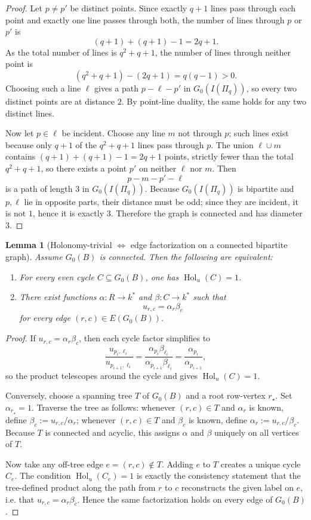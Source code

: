 \documentclass[11pt]{amsart}
\numberwithin{equation}{section}
\theoremstyle{plain}
\newtheorem{lemma}[theorem]{Lemma}
\theoremstyle{definition}
\theoremstyle{remark}
\begin{document}
\begin{proof}
Let $p\neq p'$ be distinct points. Since exactly $q+1$ lines pass through each point and exactly one line passes through both,
the number of lines through $p$ or $p'$ is
\[
(q+1)+(q+1)-1=2q+1.
\]
As the total number of lines is $q^2+q+1$, the number of lines through neither point is
\[
(q^2+q+1)-(2q+1)=q(q-1)>0.
\]
Choosing such a line $\ell$ gives a path $p-\ell-p'$ in $G_0(I(\Pi_q))$, so every two distinct points are at distance $2$.
By point-line duality, the same holds for any two distinct lines.

Now let $p\in \ell$ be incident. Choose any line $m$ not through $p$; such lines exist because only $q+1$ of the $q^2+q+1$ lines
pass through $p$. The union $\ell\cup m$ contains $(q+1)+(q+1)-1=2q+1$ points, strictly fewer than the total
$q^2+q+1$, so there exists a point $p'$ on neither $\ell$ nor $m$. Then
\[
p-m-p'-\ell
\]
is a path of length $3$ in $G_0(I(\Pi_q))$. Because $G_0(I(\Pi_q))$ is bipartite and $p,\ell$ lie in opposite parts, their distance
must be odd; since they are incident, it is not $1$, hence it is exactly $3$. Therefore the graph is connected and has diameter $3$.
\end{proof}

\begin{lemma}[Holonomy-trivial $\Longleftrightarrow$ edge factorization on a connected bipartite graph]
\label{lem:holonomy-factorization}
Assume $G_0(B)$ is connected. Then the following are equivalent:
\begin{enumerate}[leftmargin=2em]
  \item For every even cycle $C\subseteq G_0(B)$, one has $\operatorname{Hol}_{u}(C)=1$.
  \item There exist functions $\alpha:R\to k^*$ and $\beta:C\to k^*$ such that
  \[
  u_{r,c}=\alpha_r\beta_c
  \]
  for every edge $(r,c)\in E(G_0(B))$.
\end{enumerate}
\end{lemma}

\begin{proof}
If $u_{r,c}=\alpha_r\beta_c$, then each cycle factor simplifies to
\[
\frac{u_{p_i,\ell_i}}{u_{p_{i+1},\ell_i}}=\frac{\alpha_{p_i}\beta_{\ell_i}}{\alpha_{p_{i+1}}\beta_{\ell_i}}=\frac{\alpha_{p_i}}{\alpha_{p_{i+1}}},
\]
so the product telescopes around the cycle and gives $\operatorname{Hol}_{u}(C)=1$.

Conversely, choose a spanning tree $T$ of $G_0(B)$ and a root row-vertex $r_\star$. Set $\alpha_{r_\star}=1$. Traverse the tree as
follows: whenever $(r,c)\in T$ and $\alpha_r$ is known, define $\beta_c:=u_{r,c}/\alpha_r$; whenever $(r,c)\in T$ and $\beta_c$ is
known, define $\alpha_r:=u_{r,c}/\beta_c$. Because $T$ is connected and acyclic, this assigns $\alpha$ and $\beta$ uniquely on all
vertices of $T$.

Now take any off-tree edge $e=(r,c)\notin T$. Adding $e$ to $T$ creates a unique cycle $C_e$. The condition
$\operatorname{Hol}_{u}(C_e)=1$ is exactly the consistency statement that the tree-defined product along the path from $r$ to $c$
reconstructs the given label on $e$, i.e. that $u_{r,c}=\alpha_r\beta_c$. Hence the same factorization holds on every edge of
$G_0(B)$.
\end{proof}
\end{document}
